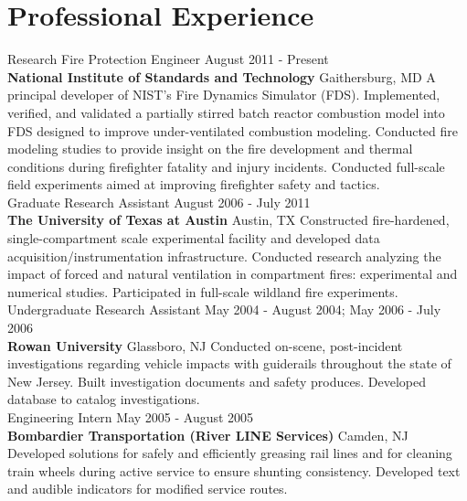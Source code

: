 \documentclass[10pt,letterpaper]{article}
\begin{document}
\section*{Professional Experience}
Research Fire Protection Engineer \hfill August 2011 - Present \\
{\bf National Institute of Standards and Technology} \hfill Gaithersburg, MD \vskip3pt
A principal developer of NIST's Fire Dynamics Simulator (FDS). Implemented, verified, and validated a partially stirred batch reactor combustion model into FDS designed to improve under-ventilated combustion modeling. Conducted fire modeling studies to provide insight on the fire development and thermal conditions during firefighter fatality and injury incidents. Conducted full-scale field experiments aimed at improving firefighter safety and tactics. \\

Graduate Research Assistant \hfill August 2006 - July 2011 \\
{\bf The University of Texas at Austin} \hfill Austin, TX \vskip3pt
Constructed fire-hardened, single-compartment scale experimental facility and developed data acquisition/instrumentation infrastructure. Conducted research analyzing the impact of forced and natural ventilation in compartment fires: experimental and numerical studies. Participated in full-scale wildland fire experiments. \\

Undergraduate Research Assistant \hfill May 2004 - August 2004; May 2006 - July 2006 \\
{\bf Rowan University} \hfill Glassboro, NJ \vskip3pt
Conducted on-scene, post-incident investigations regarding vehicle impacts with guiderails throughout the state of New Jersey. Built investigation documents and safety produces. Developed database to catalog investigations. \\

Engineering Intern \hfill May 2005 - August 2005 \\
{\bf Bombardier Transportation (River LINE Services)} \hfill Camden, NJ \vskip3pt
Developed solutions for safely and efficiently greasing rail lines and for cleaning train wheels during active service to ensure shunting consistency. Developed text and audible indicators for modified service routes. \\

\clearpage
\end{document}
